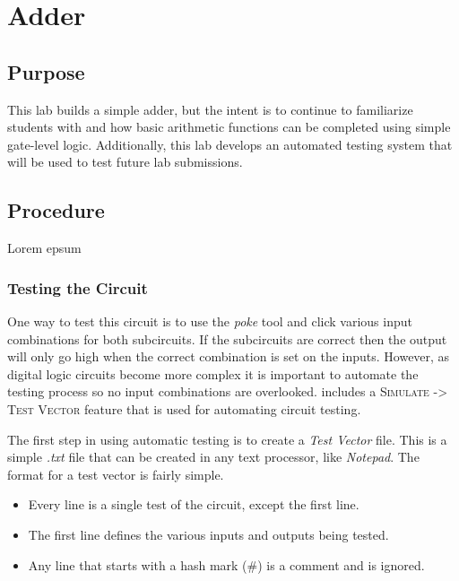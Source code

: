 \chapter{Adder}\label{add}

\section{Purpose}

This lab builds a simple adder, but the intent is to continue to familiarize students with \LE and how basic arithmetic functions can be completed using simple gate-level logic. Additionally, this lab develops an automated testing system that will be used to test future lab submissions.


\section{Procedure}

Lorem epsum

\subsection{Testing the Circuit}

One way to test this circuit is to use the \textit{poke} tool and click various input combinations for both subcircuits. If the subcircuits are correct then the output will only go high when the correct combination is set on the inputs. However, as digital logic circuits become more complex it is important to automate the testing process so no input combinations are overlooked. \LE includes a \textsc{Simulate -> Test Vector} feature that is used for automating circuit testing.

The first step in using automatic testing is to create a \textit{Test Vector} file. This is a simple \textit{.txt} file that can be created in any text processor, like \textit{Notepad}.  The format for a test vector is fairly simple.

\begin{itemize}
	\item Every line is a single test of the circuit, except the first line.
	\item The first line defines the various inputs and outputs being tested.
	\item Any line that starts with a hash mark (\#) is a comment and is ignored.
\end{itemize}

